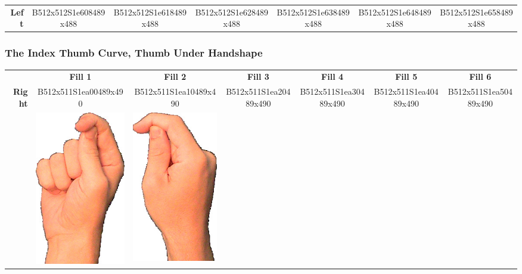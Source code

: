 \documentclass{article}
\begin{document}
\begin{center}
\begin{tabular}{r*{6}{c}}
\textbf{Left}&
B512x512S1e608489x488&
B512x512S1e618489x488&
B512x512S1e628489x488&
B512x512S1e638489x488&
B512x512S1e648489x488&
B512x512S1e658489x488\\
\end{tabular}
\end{center}

\subsubsection{The Index Thumb Curve, Thumb Under Handshape}

\begin{center}
\begin{tabular}{r*{6}{c}}
&\textbf{Fill 1}&\textbf{Fill 2}&\textbf{Fill 3}&\textbf{Fill 4}&\textbf{Fill 5}&\textbf{Fill 6}\\
\multirow{2}{*}{\textbf{Right}}&
B512x511S1ea00489x490&
B512x511S1ea10489x490&
B512x511S1ea20489x490&
B512x511S1ea30489x490&
B512x511S1ea40489x490&
B512x511S1ea50489x490\\
&
\includegraphics[scale=0.1]{images/09-07-1.jpg}&
\includegraphics[scale=0.1]{images/09-07-2.jpg}&

\end{tabular}
\end{center}
\end{document}
